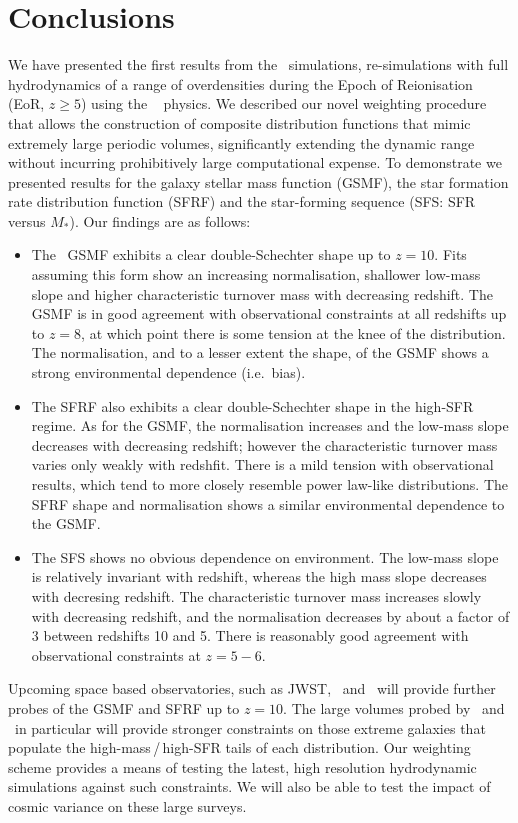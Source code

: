 \section{Conclusions}
We have presented the first results from the \flares\ simulations, re-simulations with full hydrodynamics of a range of overdensities during the Epoch of Reionisation (EoR, $z \geqslant 5$) using the \eagle\ \citep{schaye_eagle_2015} physics.
We described our novel weighting procedure that allows the construction of composite distribution functions that mimic extremely large periodic volumes, significantly extending the dynamic range without incurring prohibitively large computational expense.
To demonstrate we presented results for the galaxy stellar mass function (GSMF), the star formation rate distribution function (SFRF) and the star-forming sequence (SFS: SFR versus $M_*$).
Our findings are as follows:

\begin{itemize}
	\item The \flares\ GSMF exhibits a clear double-Schechter shape up to $z = 10$.
				Fits assuming this form show an increasing normalisation, shallower low-mass slope and higher characteristic turnover mass with decreasing redshift.
				The GSMF is in good agreement with observational constraints at all redshifts up to $z = 8$, at which point there is some tension at the knee of the distribution.
    		The normalisation, and to a lesser extent the shape, of the GSMF shows a strong environmental dependence (i.e.~bias).
  \item The SFRF also exhibits a clear double-Schechter shape in the high-SFR regime.
				As for the GSMF, the normalisation increases and the low-mass slope decreases with decreasing redshift; however the characteristic turnover mass varies only weakly with redshfit.
  			There is a mild tension with observational results, which tend to more closely resemble power law-like distributions.
				The SFRF shape and normalisation shows a similar environmental dependence to the GSMF.
  \item The SFS shows no obvious dependence on environment.
				The low-mass slope is relatively invariant with redshift, whereas the high mass slope decreases with decresing redshift.
				The characteristic turnover mass increases slowly with decreasing redshift, and the normalisation decreases by about a factor of 3 between redshifts 10 and 5.
				There is reasonably good agreement with observational constraints at $z = 5-6$.
\end{itemize}

Upcoming space based observatories, such as JWST, \euclid\ and \wfirst\ will provide further probes of the GSMF and SFRF up to $z = 10$.
The large volumes probed by \euclid\ and \wfirst\ in particular will provide stronger constraints on those extreme galaxies that populate the high-mass\,/\,high-SFR tails of each distribution.
Our weighting scheme provides a means of testing the latest, high resolution hydrodynamic simulations against such constraints.  We will also be able to test the impact of cosmic variance on these large surveys.
